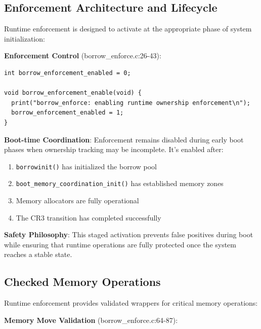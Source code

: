 \documentclass[11pt,letterpaper]{article}
\begin{document}
\subsection{Enforcement Architecture and Lifecycle}

Runtime enforcement is designed to activate at the appropriate phase of system initialization:

\textbf{Enforcement Control} (borrow\_enforce.c:26-43):

\begin{lstlisting}
int borrow_enforcement_enabled = 0;

void borrow_enforcement_enable(void) {
  print("borrow_enforce: enabling runtime ownership enforcement\n");
  borrow_enforcement_enabled = 1;
}
\end{lstlisting}

\textbf{Boot-time Coordination}: Enforcement remains disabled during early boot phases when ownership tracking may be incomplete. It's enabled after:
\begin{enumerate}
\item \texttt{borrowinit()} has initialized the borrow pool
\item \texttt{boot\_memory\_coordination\_init()} has established memory zones
\item Memory allocators are fully operational
\item The CR3 transition has completed successfully
\end{enumerate}

\textbf{Safety Philosophy}: This staged activation prevents false positives during boot while ensuring that runtime operations are fully protected once the system reaches a stable state.

\subsection{Checked Memory Operations}

Runtime enforcement provides validated wrappers for critical memory operations:

\textbf{Memory Move Validation} (borrow\_enforce.c:64-87):
\end{document}
